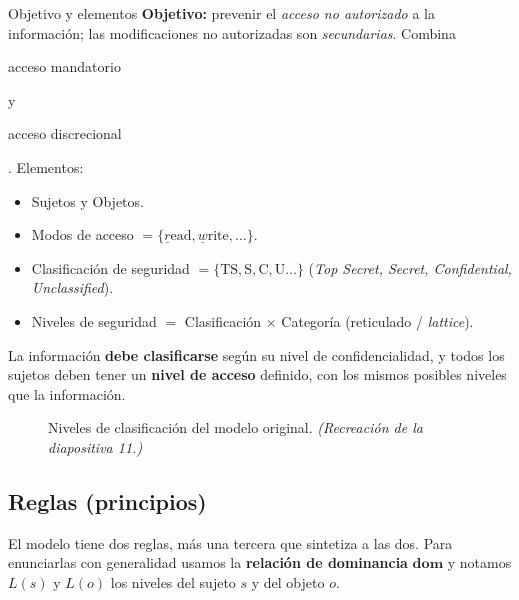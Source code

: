 \documentclass[11pt,a4paper]{article}
\newcommand{\dom}{\mathrel{\mathbf{dom}}}        %
\newcommand{\Lvl}{L}                              %
\newcommand{\highlight}[2]{\colorbox{#1}{\strut #2}}
\begin{document}
\begin{defbox}{Objetivo y elementos}
\textbf{Objetivo:} prevenir el \emph{acceso no autorizado} a la información; las
modificaciones no autorizadas son \emph{secundarias}. Combina \highlight{macGreen}{acceso
mandatorio} y \highlight{dacYellow}{acceso discrecional}. Elementos:
\begin{itemize}[leftmargin=1.4em,itemsep=1pt]
  \item Sujetos y Objetos.
  \item Modos de acceso $=\{\underline{r}\text{ead}, \underline{w}\text{rite},\dots\}$.
  \item Clasificación de seguridad $=\{\text{TS}, \text{S}, \text{C}, \text{U}\dots\}$
        (\emph{Top Secret, Secret, Confidential, Unclassified}).
  \item Niveles de seguridad $=$ Clasificación $\times$ Categoría (reticulado / \emph{lattice}).
\end{itemize}
La información \textbf{debe clasificarse} según su nivel de confidencialidad, y todos los
sujetos deben tener un \textbf{nivel de acceso} definido, con los mismos posibles niveles que
la información.
\end{defbox}

\begin{figure}[h]
\centering
{}
\caption{Niveles de clasificación del modelo original. \textit{(Recreación de la
diapositiva 11.)}}
\end{figure}

\subsection{Reglas (principios)}
El modelo tiene dos reglas, más una tercera que sintetiza a las dos. Para enunciarlas
con generalidad usamos la \textbf{relación de dominancia} $\dom$ y notamos $\Lvl(s)$ y
$\Lvl(o)$ los niveles del sujeto $s$ y del objeto $o$.
\end{document}
